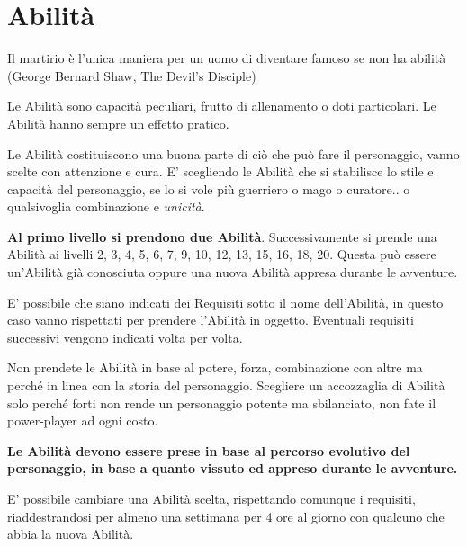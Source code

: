 \section{Abilità}\hypertarget{abilita}{}\label{abilita}

\begin{changemargin}{0.3cm}{0.3cm}\begin{enfasi}{Il martirio è l'unica maniera per un uomo di diventare famoso se non ha abilità (George Bernard Shaw, The Devil's Disciple)} \end{enfasi}\end{changemargin}\medskip

\begin{multicols}{2}

Le Abilità sono capacità peculiari, frutto di allenamento o doti particolari. Le Abilità hanno sempre un effetto pratico.

Le Abilità costituiscono una buona parte di ciò che può fare il personaggio, vanno scelte con attenzione e cura. E' scegliendo le Abilità che si stabilisce lo stile e capacità del personaggio, se lo si vole più guerriero o mago o curatore.. o qualsivoglia combinazione e \emph{unicità}.

\textbf{Al primo livello si prendono due Abilità}. Successivamente si prende una Abilità ai livelli 2, 3, 4, 5, 6, 7, 9, 10, 12, 13, 15, 16, 18, 20. Questa può essere un'Abilità già conosciuta oppure una nuova Abilità appresa durante le avventure.

E' possibile che siano indicati dei Requisiti sotto il nome dell'Abilità, in questo caso vanno rispettati per prendere l'Abilità in oggetto.
Eventuali requisiti successivi vengono indicati volta per volta.

Non prendete le Abilità in base al potere, forza, combinazione con altre ma perché in linea con la storia del personaggio.
Scegliere un accozzaglia di Abilità solo perché forti non rende un personaggio potente ma sbilanciato, non fate il power-player ad ogni costo.

\medskip

\textbf{Le Abilità devono essere prese in base al percorso evolutivo del personaggio, in base a quanto vissuto ed appreso durante le avventure.}

\medskip

E' possibile cambiare una Abilità scelta, rispettando comunque i requisiti, riaddestrandosi per almeno una settimana per 4 ore al giorno con qualcuno che abbia la nuova Abilità.


\end{multicols}
